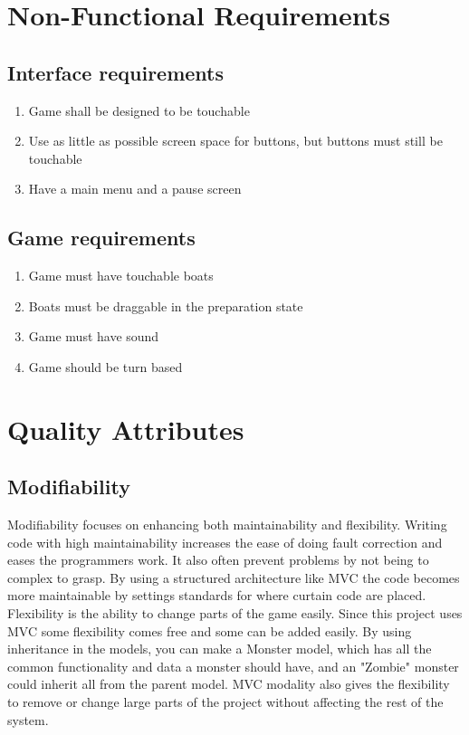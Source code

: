 	\section{Non-Functional Requirements}
		\subsection{Interface requirements}
		\begin{enumerate}
			\item Game shall be designed to be touchable
			\item Use as little as possible screen space for buttons, but buttons must still be touchable
			\item Have a main menu and a pause screen
		\end{enumerate}

		\subsection{Game requirements}
		\begin{enumerate}
			\item Game must have touchable boats
			\item Boats must be draggable in the preparation state
			\item Game must have sound
			\item Game should be turn based
		\end{enumerate}

	\section{Quality Attributes}
		\subsection{Modifiability}
			Modifiability focuses on enhancing both maintainability and flexibility. Writing code with high maintainability increases the ease of doing fault correction and eases the programmers work. It also often prevent problems by not being to complex to grasp.
			By using a structured architecture like MVC the code becomes more maintainable by settings standards for where curtain code are placed.
			Flexibility is the ability to change parts of the game easily. Since this project uses MVC some flexibility comes free and some can be added easily.
			By using inheritance in the models, you can make a Monster model, which has all the common functionality and data a monster should have, and an "Zombie" monster could inherit all from the parent model.
			MVC modality also gives the flexibility to remove or change large parts of the project without affecting the rest of the system.

